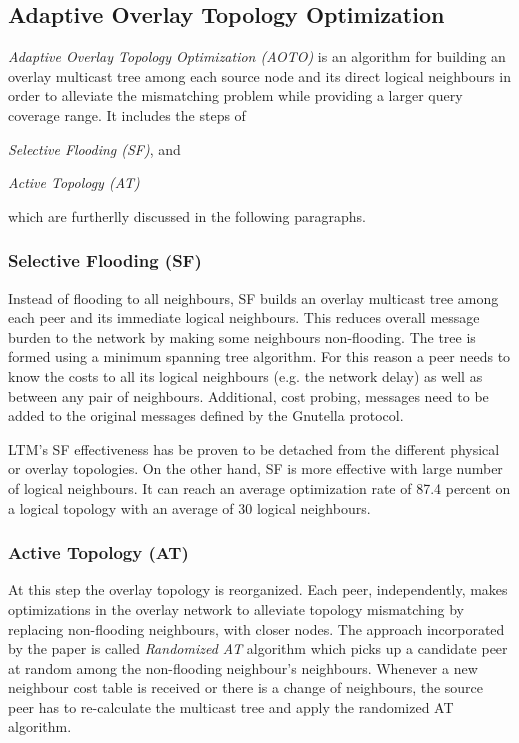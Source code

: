 \documentclass[a4paper,10pt]{article}
\begin{document}
\subsection{Adaptive Overlay Topology Optimization}
\emph{Adaptive Overlay Topology Optimization (AOTO)} \cite{liu_auto_2003} is an algorithm for building an overlay multicast tree among each source node and its direct logical neighbours in order to alleviate the mismatching problem while providing a larger query coverage range. It includes the steps of
\begin{inparaenum}
  \item \emph{Selective Flooding (SF)}, and
  \item \emph{Active Topology (AT)}
\end{inparaenum}
which are furtherlly discussed in the following paragraphs.

\subsubsection*{Selective Flooding (SF)}
Instead of flooding to all neighbours, SF builds an overlay multicast tree among each peer and its immediate logical neighbours. This reduces overall message burden to the network by making some neighbours non-flooding. The tree is formed using a minimum spanning tree algorithm. For this reason a peer needs to know the costs to all its logical neighbours (e.g. the network delay) as well as between any pair of neighbours. Additional, cost probing, messages need to be added to the original messages defined by the Gnutella protocol.

LTM's SF effectiveness has be proven to be detached from the different physical or overlay topologies. On the other hand, SF is more effective with large number of logical neighbours. It can reach an average optimization rate of 87.4 percent on a logical topology with an average of 30 logical neighbours. 

\subsubsection*{Active Topology (AT)}
At this step the overlay topology is reorganized. Each peer, independently, makes optimizations in the overlay network to alleviate topology mismatching by replacing non-flooding neighbours, with closer nodes. The approach incorporated by the paper is called \emph{Randomized AT} algorithm which picks up a candidate peer at random among the non-flooding neighbour's neighbours. Whenever a new neighbour cost table is received or there is a change of neighbours, the source peer has to re-calculate the multicast tree and apply the randomized AT algorithm.
\end{document}
